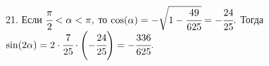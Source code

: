 21. Если $\cfrac{\pi}{2}<\alpha<\pi,$ то  $\cos(\alpha)=-\sqrt{1-\cfrac{49}{625}}=-\cfrac{24}{25}.$ Тогда $\sin(2\alpha)=2\cdot\cfrac{7}{25}\cdot\left(-\cfrac{24}{25}\right)=-\cfrac{336}{625}.$\\
